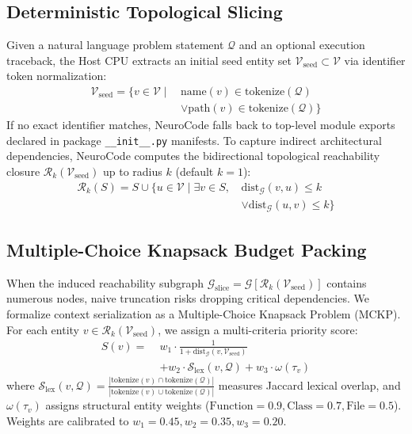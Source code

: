 \documentclass[conference]{IEEEtran}
\begin{document}
\subsection{Deterministic Topological Slicing}
Given a natural language problem statement $\mathcal{Q}$ and an optional execution traceback, the Host CPU extracts an initial seed entity set $\mathcal{V}_{\text{seed}} \subset \mathcal{V}$ via identifier token normalization:
\begin{equation}
\begin{aligned}
\mathcal{V}_{\text{seed}} = \{ v \in \mathcal{V} \mid \, &\text{name}(v) \in \text{tokenize}(\mathcal{Q}) \\
&\lor \text{path}(v) \in \text{tokenize}(\mathcal{Q}) \}
\end{aligned}
\end{equation}
If no exact identifier matches, NeuroCode falls back to top-level module exports declared in package \texttt{\_\_init\_\_.py} manifests. To capture indirect architectural dependencies, NeuroCode computes the bidirectional topological reachability closure $\mathcal{R}_k(\mathcal{V}_{\text{seed}})$ up to radius $k$ (default $k=1$):
\begin{equation}
\begin{aligned}
\mathcal{R}_k(S) = S \cup \{ u \in \mathcal{V} \mid \exists v \in S, \, &\text{dist}_{\mathcal{G}}(v, u) \le k \\
&\lor \text{dist}_{\mathcal{G}}(u, v) \le k \}
\end{aligned}
\end{equation}

\subsection{Multiple-Choice Knapsack Budget Packing}
When the induced reachability subgraph $\mathcal{G}_{\text{slice}} = \mathcal{G}[\mathcal{R}_k(\mathcal{V}_{\text{seed}})]$ contains numerous nodes, naive truncation risks dropping critical dependencies. We formalize context serialization as a Multiple-Choice Knapsack Problem (MCKP). For each entity $v \in \mathcal{R}_k(\mathcal{V}_{\text{seed}})$, we assign a multi-criteria priority score:
\begin{equation}
\begin{aligned}
S(v) = \;&w_1 \cdot \frac{1}{1 + \text{dist}_{\mathcal{G}}(v, \mathcal{V}_{\text{seed}})} \\
&+ w_2 \cdot \mathcal{S}_{\text{lex}}(v, \mathcal{Q}) + w_3 \cdot \omega(\tau_v)
\end{aligned}
\end{equation}
where $\mathcal{S}_{\text{lex}}(v, \mathcal{Q}) = \frac{|\text{tokenize}(v) \cap \text{tokenize}(\mathcal{Q})|}{|\text{tokenize}(v) \cup \text{tokenize}(\mathcal{Q})|}$ measures Jaccard lexical overlap, and $\omega(\tau_v)$ assigns structural entity weights ($\text{Function} = 0.9, \text{Class} = 0.7, \text{File} = 0.5$). Weights are calibrated to $w_1=0.45, w_2=0.35, w_3=0.20$.
\end{document}
